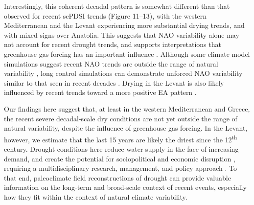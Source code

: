 \documentclass[draft,jgr]{AGUTeX}
\begin{document}
\begin{article}
\indent Interestingly, this coherent decadal pattern is somewhat different than that observed for recent scPDSI trends (Figure 11--13), with the western Mediterranean and the Levant experiencing more substantial drying trends, and with mixed signs over Anatolia.  This suggests that NAO variability alone may not account for recent drought trends, and supports interpretations that greenhouse gas forcing has an important influence \citep{Kelley2012,Kelley2015,Seager2014med}.  Although some climate model simulations suggest recent NAO trends are outside the range of natural variability \citep{Osborn:2004,Kuzmina:etal2005}, long control simulations can demonstrate unforced NAO variability similar to that seen in recent decades \citep{Semenov:etal2008}. Drying in the Levant is also likely influenced by recent trends toward a more positive EA pattern \citep{Krichak:etal2002,Krichak:etal2005,Lim:2014}.

\indent Our findings here suggest that, at least in the western Mediterranean and Greece, the recent severe decadal-scale dry conditions are not yet outside the range of natural variability, despite the influence of greenhouse gas forcing. In the Levant, however, we estimate that the last 15 years are likely the driest since the 12\textsuperscript{th} century. Drought conditions here reduce water supply in the face of increasing demand, and create the potential for sociopolitical and economic disruption \citep[e.g.][]{Gleick2014,Kelley2015}, requiring a multidisciplinary research, management, and policy approach \citep{SolhvanGinkel2014}. To that end, paleoclimate field reconstructions of drought can provide valuable information on the long-term and broad-scale context of recent events, especially how they fit within the context of natural climate variability.






\end{article}
\end{document}
